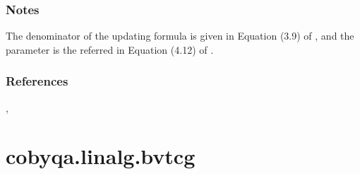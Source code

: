 \documentclass[letterpaper,10pt,english]{sphinxmanual}
\begin{document}
\begin{fulllineitems}
\subsubsection*{Notes}

\sphinxAtStartPar
The denominator of the updating formula is given in Equation (3.9) of ,
and the parameter  is the referred in Equation (4.12) of .
\subsubsection*{References}

\sphinxAtStartPar
{}, 

\end{fulllineitems}



\section{cobyqa.linalg.bvtcg}
\label{\detokenize{refs/generated/cobyqa.linalg.bvtcg:cobyqa-linalg-bvtcg}}\label{\detokenize{refs/generated/cobyqa.linalg.bvtcg::doc}}
\end{document}

